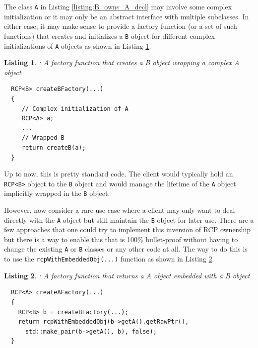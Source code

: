 \documentclass[pdf,ps2pdf,11pt]{SANDreport}
\newtheorem{listing}{Listing}
\begin{document}
The class {}\texttt{A} in Listing {}\ref{listing:B_owns_A_decl} may
involve some complex initialization or it may only be an abstract
interface with multiple subclasses.  In either case, it may make sense
to provide a factory function (or a set of such functions) that
creates and initializes a {}\texttt{B} object for different complex
initializations of {}\texttt{A} objects as shown in Listing
{}\ref{listing:createBFactory}.

\begin{listing}: A factory function that creates a B object wrapping a complex A object \\
\label{listing:createBFactory}
{\small\begin{verbatim}
  RCP<B> createBFactory(...)
  {
     // Complex initialization of A
     RCP<A> a;
     ...
     // Wrapped B
     return createB(a);
  }
\end{verbatim}}
\end{listing}

Up to now, this is pretty standard code.  The client would typically
hold an {}\texttt{RCP<B>} object to the {}\texttt{B} object and would
manage the lifetime of the {}\texttt{A} object implicitly wrapped in
the {}\texttt{B} object.

However, now consider a rare use case where a client may only want to
deal directly with the {}\texttt{A} object but still maintain the
{}\texttt{B} object for later use.  There are a few approaches that
one could try to implement this inversion of RCP ownership but there
is a way to enable this that is 100\% bullet-proof without having to
change the existing {}\texttt{A} or {}\texttt{B} classes or any other
code at all.  The way to do this is to use the
{}\texttt{rcpWithEmbeddedObj(...)} function as shown in Listing
{}\ref{listing:A_owns_B_owns_A}.

\begin{listing}: A factory function that returns a A object
embedded with a B object \\
\label{listing:A_owns_B_owns_A}
{\small\begin{verbatim}
  RCP<A> createAFactory(...)
  {
    RCP<B> b = createBFactory(...);
    return rcpWithEmbeddedObj(b->getA().getRawPtr(),
      std::make_pair(b->getA(), b), false);
  }
\end{verbatim}}
\end{listing}
\end{document}
